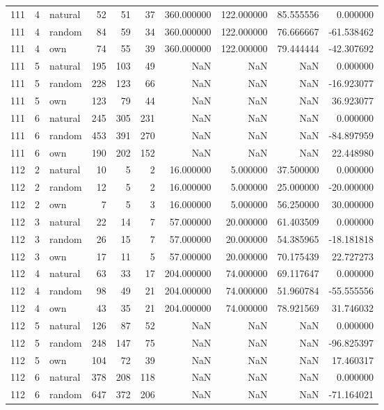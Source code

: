 \begin{table}[htbp]
\begin{tabular}{rrlrrrrrrr}
111 & 4 & natural & 52 & 51 & 37 & 360.000000 & 122.000000 & 85.555556 & 0.000000 \\
111 & 4 & random & 84 & 59 & 34 & 360.000000 & 122.000000 & 76.666667 & -61.538462 \\
111 & 4 & own & 74 & 55 & 39 & 360.000000 & 122.000000 & 79.444444 & -42.307692 \\
111 & 5 & natural & 195 & 103 & 49 & NaN & NaN & NaN & 0.000000 \\
111 & 5 & random & 228 & 123 & 66 & NaN & NaN & NaN & -16.923077 \\
111 & 5 & own & 123 & 79 & 44 & NaN & NaN & NaN & 36.923077 \\
111 & 6 & natural & 245 & 305 & 231 & NaN & NaN & NaN & 0.000000 \\
111 & 6 & random & 453 & 391 & 270 & NaN & NaN & NaN & -84.897959 \\
111 & 6 & own & 190 & 202 & 152 & NaN & NaN & NaN & 22.448980 \\
112 & 2 & natural & 10 & 5 & 2 & 16.000000 & 5.000000 & 37.500000 & 0.000000 \\
112 & 2 & random & 12 & 5 & 2 & 16.000000 & 5.000000 & 25.000000 & -20.000000 \\
112 & 2 & own & 7 & 5 & 3 & 16.000000 & 5.000000 & 56.250000 & 30.000000 \\
112 & 3 & natural & 22 & 14 & 7 & 57.000000 & 20.000000 & 61.403509 & 0.000000 \\
112 & 3 & random & 26 & 15 & 7 & 57.000000 & 20.000000 & 54.385965 & -18.181818 \\
112 & 3 & own & 17 & 11 & 5 & 57.000000 & 20.000000 & 70.175439 & 22.727273 \\
112 & 4 & natural & 63 & 33 & 17 & 204.000000 & 74.000000 & 69.117647 & 0.000000 \\
112 & 4 & random & 98 & 49 & 21 & 204.000000 & 74.000000 & 51.960784 & -55.555556 \\
112 & 4 & own & 43 & 35 & 21 & 204.000000 & 74.000000 & 78.921569 & 31.746032 \\
112 & 5 & natural & 126 & 87 & 52 & NaN & NaN & NaN & 0.000000 \\
112 & 5 & random & 248 & 147 & 75 & NaN & NaN & NaN & -96.825397 \\
112 & 5 & own & 104 & 72 & 39 & NaN & NaN & NaN & 17.460317 \\
112 & 6 & natural & 378 & 208 & 118 & NaN & NaN & NaN & 0.000000 \\
112 & 6 & random & 647 & 372 & 206 & NaN & NaN & NaN & -71.164021 \\

\end{tabular}
\end{table}
